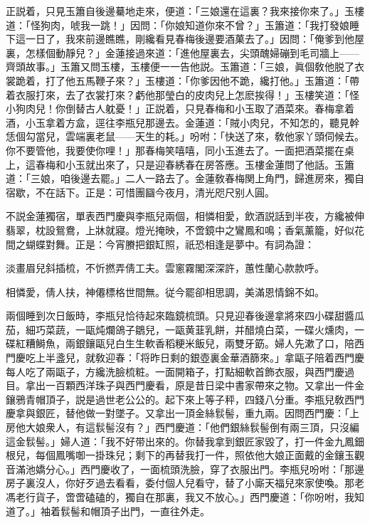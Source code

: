 正説着，只見玉簫自後邊驀地走來，便道：「三娘還在這裏？我來接你來了。」玉樓道：「怪狗肉，唬我一跳！」因問：「你娘知道你來不曾？」玉簫道：「我打發娘睡下這一日了，我來前邊瞧瞧，剛纔看見春梅後邊要酒菓去了。」因問：「俺爹到他屋裏，怎樣個動靜兒？」金蓮接過來道：「進他屋裏去，尖頭醜婦磞到毛司牆上——齊頭故事。」玉簫又問玉樓，玉樓便一一告他説。玉簫道：「三娘，眞個敎他脱了衣裳跪着，打了他五馬鞭子來？」玉樓道：「你爹因他不跪，纔打他。」玉簫道：「帶着衣服打來，去了衣裳打來？虧他那瑩白的皮肉兒上怎麽挨得！」玉樓笑道：「怪小狗肉兒！你倒替古人躭憂！」正説着，只見春梅和小玉取了酒菜來。春梅拿着酒，小玉拿着方盒，逕往李瓶兒那邊去。金蓮道：「賊小肉兒，不知怎的，聽見幹恁個勾當兒，雲端裏老鼠——天生的耗。」吩咐：「快送了來，敎他家丫頭伺候去。你不要管他，我要使你哩！」那春梅笑嘻嘻，同小玉進去了。一面把酒菜擺在桌上，這春梅和小玉就出來了，只是迎春綉春在房答應。玉樓金蓮問了他話。玉簫道：「三娘，咱後邊去罷。」二人一路去了。金蓮敎春梅関上角門，歸進房來，獨自宿歇，不在話下。正是：可惜團圝今夜月，清光咫尺别人圓。

不説金蓮獨宿，單表西門慶與李瓶兒兩個，相憐相愛，飲酒説話到半夜，方纔被伸翡翠，枕設鴛鴦，上牀就寢。燈光掩映，不啻鏡中之鸞鳳和鳴；香氣薰籠，好似花間之蝴蝶對舞。正是：今宵賸把銀缸照，祇恐相逢是夢中。有詞為證：

\begin{myquote}
淡畫眉兒斜插梳，不忻撚弄倩工夫。雲窻霧閣深深許，蕙性蘭心款款呼。

相憐愛，倩人扶，神僊標格世間無。従今罷卻相思調，美滿恩情錦不如。
\end{myquote}

兩個睡到次日飯時，李瓶兒恰待起來臨鏡梳頭。只見迎春後邊拿將來四小碟甜醬瓜茄，細巧菜蔬，一甌炖爛鴿子鶵兒，一甌黄韮乳餅，并醋燒白菜，一碟火燻肉，一碟紅糟鰣魚，兩銀鑲甌兒白生生軟香稻粳米飯兒，兩雙牙筯。婦人先漱了口，陪西門慶吃上半盞兒，就敎迎春：「将昨日剩的銀壺裏金華酒篩來。」拿甌子陪着西門慶每人吃了兩甌子，方纔洗臉梳粧。一面開箱子，打點細軟首飾衣服，與西門慶過目。拿出一百顆西洋珠子與西門慶看，原是昔日梁中書家帶來之物。又拿出一件金鑲鴉青帽頂子，説是過世老公公的。起下來上等子秤，四錢八分重。李瓶兒敎西門慶拿與銀匠，替他做一對墜子。又拿出一頂金絲䯼髻，重九兩。因問西門慶：「上房他大娘衆人，有這䯼髻沒有？」西門慶道：「他們銀絲䯼髻倒有兩三頂，只沒編這金䯼髻。」婦人道：「我不好带出來的。你替我拿到銀匠家毀了，打一件金九鳳鈿根兒，每個鳳嘴啣一掛珠兒；剩下的再替我打一件，照依他大娘正面戴的金鑲玉觀音滿池嬌分心。」西門慶收了，一面梳頭洗臉，穿了衣服出門。李瓶兒吩咐：「那邊房子裏沒人，你好歹過去看看，委付個人兒看守，替了小廝天福兒來家使喚。那老馮老行貨子，啻啻磕磕的，獨自在那裏，我又不放心。」西門慶道：「你吩咐，我知道了。」袖着䯼髻和帽頂子出門，一直往外走。

